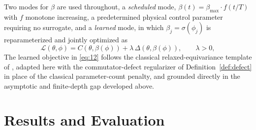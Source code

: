 \documentclass[10pt,twocolumn]{article}
\theoremstyle{remark}
\begin{document}
Two modes for $\beta$ are used throughout, a \emph{scheduled} mode, $\beta(t) = \beta_{\max}\cdot f(t/T)$ with $f$ monotone increasing, a predetermined physical control parameter requiring no surrogate, and a \emph{learned} mode, in which $\beta_j = \sigma(\phi_j)$ is reparameterized and jointly optimized as
\begin{equation}
\mathcal{L}(\theta,\phi) = C(\theta,\beta(\phi)) + \lambda\, \Delta(\theta,\beta(\phi)), \qquad \lambda > 0, \label{eq:12}
\end{equation}
The learned objective in \eqref{eq:12} follows the classical relaxed-equivariance template of \cite{vanderouderaa2022relaxed}, adapted here with the commutator-defect regularizer of Definition~\ref{def:defect} in place of the classical parameter-count penalty, and grounded directly in the asymptotic and finite-depth gap developed above.

\bigskip

\section{Results and Evaluation}
\end{document}
